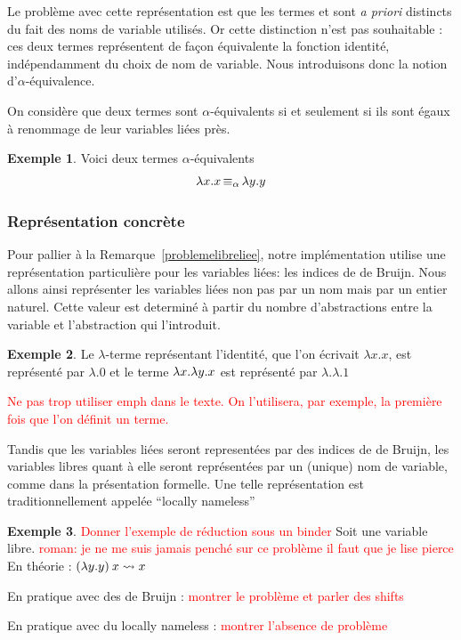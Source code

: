 \documentclass {article}
\theoremstyle{definition}
\newtheorem{example}{Exemple}
\theoremstyle{remark}
\newcommand{\todo}[1]{\textcolor{red}{#1}}
\begin{document}
\newcommand{\equivAlpha}{\mathop{\equiv_\alpha}}

Le problème avec cette représentation est que les termes
 et  sont \textit{a
  priori} distincts du fait des noms de variable utilisés. Or cette
distinction n'est pas souhaitable : ces deux termes représentent de
façon équivalente la fonction identité, indépendamment du choix de nom
de variable. Nous introduisons donc la notion d'$\alpha$-équivalence.

On considère que deux termes sont \(\alpha\)-équivalents si et seulement si ils sont 
égaux à renommage de leur variables liées près. 
\begin{example}
  Voici deux termes \(\alpha\)-équivalents 
  \begin{align*}
    & \Lam{x}{\Var{x}} \equivAlpha \Lam{y}{\Var{y}} \\
  \end{align*}
\end{example}

\subsubsection{Représentation concrète}
 
Pour pallier à la Remarque~\ref{problemelibreliee}, notre implémentation utilise une représentation
particulière pour les variables liées: les indices de de Bruijn.  Nous
allons ainsi représenter les variables liées non pas par un nom mais
par un entier naturel. Cette valeur est determiné à partir du nombre
d'abstractions entre la variable et l'abstraction qui l'introduit.

\begin{example}
  Le $\lambda$-terme représentant l'identité, que l'on écrivait \(\lambda x.x\), est représenté par \(\lambda.0\)
  et le terme $\lambda x. \lambda y. x$ est représenté par $\lambda.\lambda.1$ 
\end{example}

\todo{Ne pas trop utiliser emph dans le texte. On l'utilisera, par
  exemple, la première fois que l'on définit un terme.}

Tandis que les variables liées seront representées par des
indices de de Bruijn, les variables libres quant à elle seront
représentées par un (unique) nom de variable, comme dans la
présentation formelle. Une telle représentation est traditionnellement
appelée ``locally nameless''~\citep{chargueraud:locally-nameless}

\begin{example}
  \todo{Donner l'exemple de réduction sous un binder}
  Soit  une variable libre.
  \todo{roman: je ne me suis jamais penché sur ce problème il faut que je lise pierce}
  En théorie :
  \((\lambda y. y)\:x \leadsto x\)

  En pratique avec des de Bruijn : \todo{montrer le problème et parler des shifts}

  En pratique avec du locally nameless : \todo{montrer l'absence de problème}

\end{example}
\end{document}
